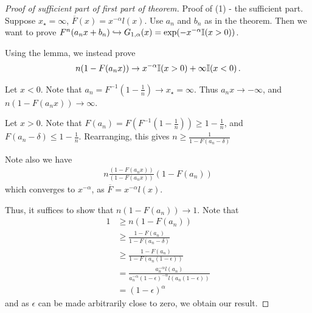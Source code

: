 \begin{proof}[Proof of sufficient part of first part of theorem]
  Proof of (1) - the sufficient part.  Suppose $x_{\star} = \infty$,
  $\overline F(x) = x^{-\alpha} l(x)$.  Use $a_{n}$ and $b_{n}$ as in
  the theorem.  Then we want to prove $F^{n}(a_{n} x + b_{n})
  \hookrightarrow G_{1, \alpha}(x) = \exp(-x^{-\alpha} \I{x > 0})$.

  Using the lemma, we instead prove
  \begin{align}
    \label{eq:127}
    n(1 - F(a_{n} x)) \rightarrow x^{-\alpha} \I{x > 0} + \infty \I{x
      < 0}.
  \end{align}

  Let $x < 0$.  Note that $a_{n} = F^{-1}(1 - \frac{1}{n}) \rightarrow
  x_{\star} = \infty$.  Thus $a_{n} x \rightarrow - \infty$, and $n(1
  - F(a_{n} x)) \rightarrow \infty$.

  Let $x > 0$. Note that $F(a_{n}) = F(F^{-1}(1 - \frac{1}{n})) \geq 1
  - \frac{1}{n}$, and $F(a_{n} - \delta) \leq 1 - \frac{1}{n}$.
  Rearranging, this gives $n \geq \frac{1}{1 - F(a_{n} - \delta)}$

  Note also we have
  \begin{align}
    \label{eq:128}
    n \frac{(1-F(a_{n} x))}{(1 - F(a_{n} x))} (1 - F(a_{n}))
  \end{align}
  which converges to $x^{-\alpha}$, as $\overline F = x^{-\alpha} l(x)$.

  Thus, it suffices to show that $n(1 - F(a_{n})) \rightarrow 1$.
  Note that
  \begin{align}
    \label{eq:129}
    1 &\geq n(1 - F(a_{n})) \\
    &\geq \frac{1-F(a_{n})}{1 - F(a_{n} - \delta)} \\
    &\geq \frac{1 - F(a_{n})}{1 - F(a_{n}(1 - \epsilon))}  \\
    &= \frac{a_{n}^{-\alpha} l(a_{n})}{a_{n}^{-\alpha}
      (1-\epsilon)^{-\alpha}l(a_{n}(1 - \epsilon))} \\
    &= (1 - \epsilon)^{\alpha}
  \end{align}
  and as $\epsilon$ can be made arbitrarily close to zero, we obtain
  our result.
\end{proof}

